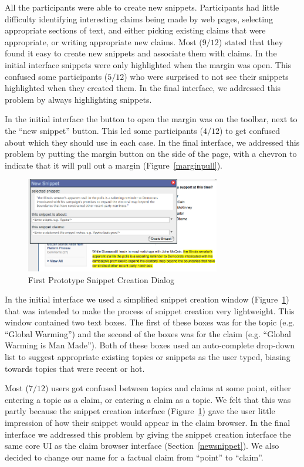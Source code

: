 \documentclass{chi2009}
\begin{document}
All the participants were able to create new snippets. Participants had little difficulty identifying interesting claims being made by web pages, selecting appropriate sections of text, and either picking existing claims that were appropriate, or writing appropriate new claims. Most ($9/12$) stated that they found it easy to create new snippets and associate them with claims.
In the initial interface snippets were only highlighted when the margin was open. This confused some participants ($5/12$) who were surprised to not see their snippets highlighted when they created them. In the final interface, we addressed this problem by always highlighting snippets.

In the initial interface the button to open the margin was on the toolbar, next to the ``new snippet'' button. This led some participants ($4/12$) to get confused about which they should use in each case. In the final interface, we addressed this problem by putting the margin button on the side of the page, with a chevron to indicate that it will pull out a margin (Figure~\ref{marginpull}).

\begin{figure}[ht]
	\includegraphics[width=8.5cm]{../screenshots/snippetdialog_sm.jpg}
	\caption{First Prototype Snippet Creation Dialog}
	\label{oldsnippetbox}
\end{figure}

In the initial interface we used a simplified snippet creation window (Figure~\ref{oldsnippetbox}) that was intended to make the process of snippet creation very lightweight. This window contained two text boxes. The first of these boxes was for the topic (e.g. ``Global Warming'') and the second of the boxes was for the claim (e.g. ``Global Warming is Man Made''). Both of these boxes used an auto-complete drop-down list to suggest appropriate existing topics or snippets as the user typed, 
biasing towards topics that were recent or hot. 

Most ($7/12$) users got confused between topics and claims at some point, either entering a topic as a claim, or entering a claim as a topic. We felt that this was partly because the snippet creation interface (Figure~\ref{oldsnippetbox}) gave the user little impression of how their snippet would appear in the claim browser. In the final interface we addressed this problem by giving the snippet creation interface the same core UI as the claim browser interface (Section~\ref{newsnippet}). We also decided to change our name for a factual claim from ``point'' to ``claim''.
\end{document}
